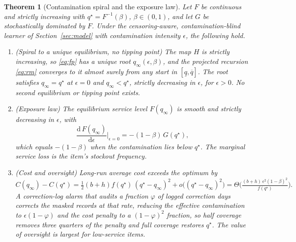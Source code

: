 \documentclass[11pt]{article}
\theoremstyle{plain}
\newtheorem{theorem}{Theorem}
\begin{document}
\begin{mdframed}[linewidth=0.6pt,roundcorner=3pt,backgroundcolor=black!2]
\begin{theorem}[Contamination spiral and the exposure law]\label{thm:main}
Let $F$ be continuous and strictly increasing with $q^\star=F^{-1}(\beta)$,
$\beta\in(0,1)$, and let $G$ be stochastically dominated by $F$. Under the
censoring-aware, contamination-blind learner of Section~\ref{sec:model} with
contamination intensity $\epsilon$, the following hold.
\begin{enumerate}[label=\textup{(\roman*)},leftmargin=2em,itemsep=0.3em]
  \item \textup{(Spiral to a unique equilibrium, no tipping point)} The map $H$ is
  strictly increasing, so \eqref{eq:fp} has a unique root $q_\infty(\epsilon,\beta)$,
  and the projected recursion \eqref{eq:rm} converges to it almost surely from any
  start in $[\underline q,\overline q]$. The root satisfies $q_\infty=q^\star$ at
  $\epsilon=0$ and $q_\infty<q^\star$, strictly decreasing in $\epsilon$, for
  $\epsilon>0$. No second equilibrium or tipping point exists.

  \item \textup{(Exposure law)} The equilibrium service level $F(q_\infty)$ is
  smooth and strictly decreasing in $\epsilon$, with
  \begin{equation}\label{eq:law}
    \frac{\mathrm{d}\,F(q_\infty)}{\mathrm{d}\epsilon}\bigg|_{\epsilon=0}
    =-(1-\beta)\,G(q^\star),
  \end{equation}
  which equals $-(1-\beta)$ when the contamination lies below $q^\star$. The
  marginal service loss is the item's stockout frequency.

  \item \textup{(Cost and oversight)} Long-run average cost exceeds the optimum by
  \begin{equation}\label{eq:cost}
    C(q_\infty)-C(q^\star)
    =\tfrac12(b+h)f(q^\star)\,(q^\star-q_\infty)^2+o\big((q^\star-q_\infty)^2\big)
    =\Theta\!\Big(\tfrac{(b+h)\,\epsilon^2(1-\beta)^2}{f(q^\star)}\Big).
  \end{equation}
  A correction-log alarm that audits a fraction $\varphi$ of logged correction
  days corrects the masked records at that rate, reducing the effective
  contamination to $\epsilon(1-\varphi)$ and the cost penalty to a
  $(1-\varphi)^2$ fraction, so half coverage removes three quarters of the penalty
  and full coverage restores $q^\star$. The value of oversight is largest for
  low-service items.
\end{enumerate}
\end{theorem}
\end{mdframed}
\end{document}
